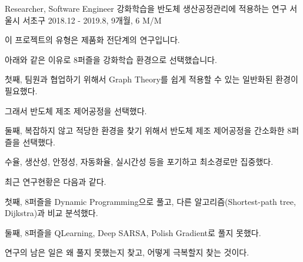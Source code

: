 \begin{cventries}
  \cventry
    {Researcher, Software Engineer} %
    {강화학습을 반도체 생산공정관리에 적용하는 연구} %
    {서울시 서초구} %
    {2018.12 - 2019.8, 9개월, 6 M/M} %
    {
      \begin{cvitems} %
        \item {이 프로젝트의 유형은 제품화 전단계의 연구입니다.}
        \item {아래와 같은 이유로 8퍼즐을 강화학습 환경으로 선택했습니다.}
        \item {첫째, 팀원과 협업하기 위해서 Graph Theory를 쉽게 적용할 수 있는 일반화된 환경이 필요했다.}
        \item {그래서 반도체 제조 제어공정을 선택했다.}
        \item {둘째, 복잡하지 않고 적당한 환경을 찾기 위해서 반도체 제조 제어공정을 간소화한 8퍼즐을 선택했다.}
        \item {수율, 생산성, 안정성, 자동화율, 실시간성 등을 포기하고 최소경로만 집중했다.}
        \item {최근 연구현황은 다음과 같다.}
        \item {첫째, 8퍼즐을 Dynamic Programming으로 풀고, 다른 알고리즘(Shortest-path tree, Dijkstra)과 비교 분석했다.}
        \item {둘째, 8퍼즐을 QLearning, Deep SARSA, Polish Gradient로 풀지 못했다.}
        \item {연구의 남은 일은 왜 풀지 못했는지 찾고, 어떻게 극복할지 찾는 것이다.}
      \end{cvitems}
    }


\end{cventries}
